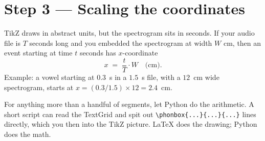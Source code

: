 \documentclass[11pt,a4paper]{article}
\newcommand{\phonbox}[3]{%
    \draw[fill=phoncolor, draw=black] (#1,-0.5) rectangle (#2,0);
    \node at ({(#1+#2)/2},-0.25) {#3};
}
\begin{document}
\begin{center}
\end{center}

\section{Step 3 --- Scaling the coordinates}

TikZ draws in abstract units, but the spectrogram sits in seconds. If your
audio file is $T$ seconds long and you embedded the spectrogram at width $W$
cm, then an event starting at time $t$ seconds has $x$-coordinate
\[
x \;=\; \frac{t}{T} \cdot W \quad \text{(cm)}.
\]
Example: a vowel starting at $0.3$~s in a $1.5$~s file, with a $12$~cm wide
spectrogram, starts at $x = (0.3/1.5) \times 12 = 2.4$~cm.

For anything more than a handful of segments, let Python do the arithmetic.
A short script can read the TextGrid and spit out
\verb|\phonbox{...}{...}{...}| lines directly, which you then
\verb|| into the TikZ picture. LaTeX does the drawing; Python does
the math.
\end{document}
